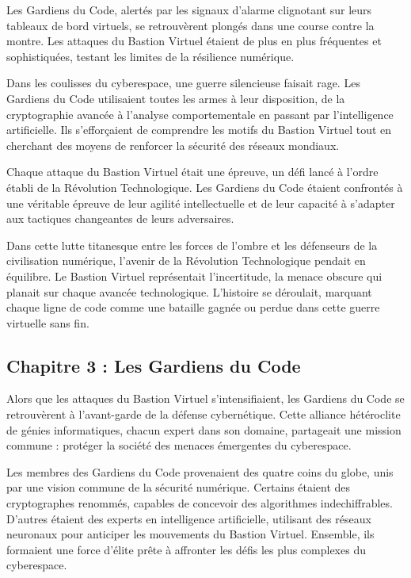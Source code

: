 \documentclass{./StyCls/MyArticle}
\begin{document}
Les Gardiens du Code, alertés par les signaux d'alarme clignotant sur leurs tableaux de bord virtuels, se retrouvèrent plongés dans une course contre la montre. Les attaques du Bastion Virtuel étaient de plus en plus fréquentes et sophistiquées, testant les limites de la résilience numérique.

Dans les coulisses du cyberespace, une guerre silencieuse faisait rage. Les Gardiens du Code utilisaient toutes les armes à leur disposition, de la cryptographie avancée à l'analyse comportementale en passant par l'intelligence artificielle. Ils s'efforçaient de comprendre les motifs du Bastion Virtuel tout en cherchant des moyens de renforcer la sécurité des réseaux mondiaux.

Chaque attaque du Bastion Virtuel était une épreuve, un défi lancé à l'ordre établi de la Révolution Technologique. Les Gardiens du Code étaient confrontés à une véritable épreuve de leur agilité intellectuelle et de leur capacité à s'adapter aux tactiques changeantes de leurs adversaires.

Dans cette lutte titanesque entre les forces de l'ombre et les défenseurs de la civilisation numérique, l'avenir de la Révolution Technologique pendait en équilibre. Le Bastion Virtuel représentait l'incertitude, la menace obscure qui planait sur chaque avancée technologique. L'histoire se déroulait, marquant chaque ligne de code comme une bataille gagnée ou perdue dans cette guerre virtuelle sans fin.


\subsection{Chapitre 3 : Les Gardiens du Code}


Alors que les attaques du Bastion Virtuel s'intensifiaient, les Gardiens du Code se retrouvèrent à l'avant-garde de la défense cybernétique. Cette alliance hétéroclite de génies informatiques, chacun expert dans son domaine, partageait une mission commune : protéger la société des menaces émergentes du cyberespace.

Les membres des Gardiens du Code provenaient des quatre coins du globe, unis par une vision commune de la sécurité numérique. Certains étaient des cryptographes renommés, capables de concevoir des algorithmes indechiffrables. D'autres étaient des experts en intelligence artificielle, utilisant des réseaux neuronaux pour anticiper les mouvements du Bastion Virtuel. Ensemble, ils formaient une force d'élite prête à affronter les défis les plus complexes du cyberespace.
\end{document}
